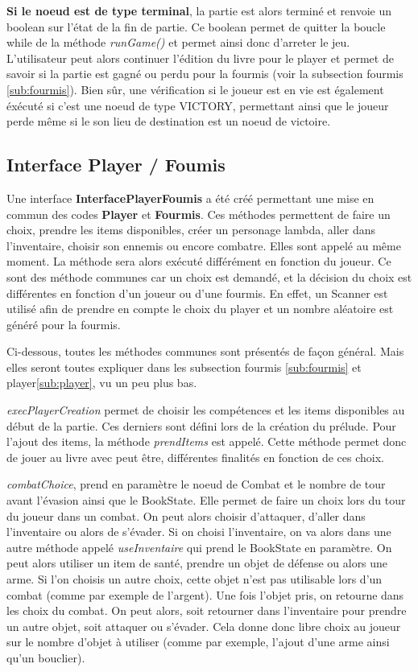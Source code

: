 			\textbf{Si le noeud est de type terminal}, la partie est alors terminé et renvoie un boolean sur l'état de la fin de partie. Ce boolean permet de quitter la boucle while de la méthode \textit{runGame()} et permet ainsi donc d'arreter le jeu. L'utilisateur peut alors continuer l'édition du livre pour le player et permet de savoir si la partie est gagné ou perdu pour la fourmis (voir la subsection fourmis \ref{sub:fourmis}). Bien sûr, une vérification si le joueur est en vie est également éxécuté si c'est une noeud de type VICTORY, permettant ainsi que le joueur perde même si le son lieu de destination est un noeud de victoire.

		\subsection{Interface Player / Foumis}
			Une interface \textbf{InterfacePlayerFoumis} a été créé permettant une mise en commun des codes \textbf{Player} et \textbf{Fourmis}. Ces méthodes permettent de faire un choix, prendre les items disponibles, créer un personage lambda, aller dans l'inventaire, choisir son ennemis ou encore combatre. Elles sont appelé au même moment. La méthode sera alors exécuté différément en fonction du joueur. Ce sont des méthode communes car un choix est demandé, et la décision du choix est différentes en fonction d'un joueur ou d'une fourmis. En effet, un Scanner est utilisé afin de prendre en compte le choix du player et un nombre aléatoire est généré pour la fourmis.

			Ci-dessous, toutes les méthodes communes sont présentés de façon général. Mais elles seront toutes expliquer dans les subsection fourmis \ref{sub:fourmis} et player\ref{sub:player}, vu un peu plus bas.

			\textit{execPlayerCreation} permet de choisir les compétences et les items disponibles au début de la partie. Ces derniers sont défini lors de la création du prélude. Pour l'ajout des items, la méthode \textit{prendItems} est appelé. Cette méthode permet donc de jouer au livre avec peut être, différentes finalités en fonction de ces choix.

			\textit{combatChoice}, prend en paramètre le noeud de Combat et le nombre de tour avant l'évasion ainsi que le BookState. Elle permet de faire un choix lors du tour du joueur dans un combat. On peut alors choisir d'attaquer, d'aller dans l'inventaire ou alors de s'évader. Si on choisi l'inventaire, on va alors dans une autre méthode appelé \textit{useInventaire} qui prend le BookState en paramètre. On peut alors utiliser un item de santé, prendre un objet de défense ou alors une arme. Si l'on choisis un autre choix, cette objet n'est pas utilisable lors d'un combat (comme par exemple de l'argent). Une fois l'objet pris, on retourne dans les choix du combat. On peut alors, soit retourner dans l'inventaire pour prendre un autre objet, soit attaquer ou s'évader. Cela donne donc libre choix au joueur sur le nombre d'objet à utiliser (comme par exemple, l'ajout d'une arme ainsi qu'un bouclier).

